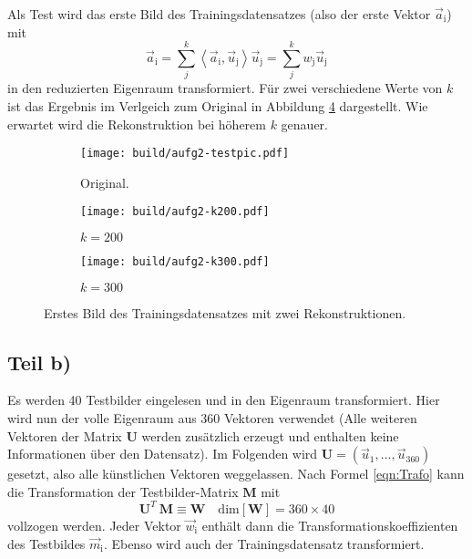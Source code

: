 Als Test wird das erste Bild des Trainingsdatensatzes
(also der erste Vektor $\vec{a}_\text{i}$)
mit
\begin{equation}
  \vec{a}_\text{i} =
  \sum_j^k \left<\vec{a}_\text{i}, \vec{u}_\text{j}\right> \vec{u}_\text{j}
  = \sum_j^k w_\text{j} \vec{u}_\text{j}
  \label{eqn:Trafo}
\end{equation}
in den reduzierten Eigenraum transformiert.
Für zwei verschiedene Werte von $k$ ist das Ergebnis im Verlgeich zum Original
in Abbildung \ref{fig:Testpicture} dargestellt.
Wie erwartet wird die Rekonstruktion bei höherem $k$ genauer.
\begin{figure}
  \centering
  \begin{subfigure}{0.32\textwidth}
    \texttt{[image: build/aufg2-testpic.pdf]}
    \caption{Original.}
    \label{sub:original}
  \end{subfigure}
  \begin{subfigure}{0.32\textwidth}
    \texttt{[image: build/aufg2-k200.pdf]}
    \caption{$k = 200$}
    \label{sub:k200}
  \end{subfigure}
  \begin{subfigure}{0.32\textwidth}
    \texttt{[image: build/aufg2-k300.pdf]}
    \caption{$k = 300$}
    \label{sub:k300}
  \end{subfigure}
  \caption{Erstes Bild des Trainingsdatensatzes mit zwei Rekonstruktionen.}
  \label{fig:Testpicture}
\end{figure}

\subsection*{Teil b)}

Es werden 40 Testbilder eingelesen und in den Eigenraum transformiert.
Hier wird nun der volle Eigenraum aus 360 Vektoren verwendet (Alle weiteren Vektoren
der Matrix $\mathbf{U}$ werden zusätzlich erzeugt und enthalten keine Informationen über
den Datensatz).
Im Folgenden wird
$\mathbf{U} = \left(\vec{u}_\text{1}, ..., \vec{u}_\text{360}\right)$
gesetzt, also alle künstlichen Vektoren weggelassen.
Nach Formel \eqref{eqn:Trafo} kann die Transformation der Testbilder-Matrix $\mathbf{M}$
mit
\begin{equation*}
  \mathbf{U}^T \: \mathbf{M} \equiv \mathbf{W} \quad
  \text{dim}\!\left[\mathbf{W}\right] = 360 \times 40
\end{equation*}
vollzogen werden.
Jeder Vektor $\vec{w}_\text{i}$ enthält dann die Transformationskoeffizienten
des Testbildes $\vec{m}_\text{i}$.
Ebenso wird auch der Trainingsdatensatz transformiert.

